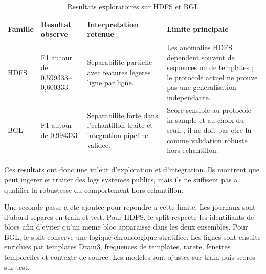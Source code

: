 \begin{table}[H]
\centering
\caption{Resultats exploratoires sur HDFS et BGL}
\label{tab:hdfs-bgl-exploratoires}
\scriptsize
\begin{tabularx}{\textwidth}{p{2.5cm}p{3.4cm}p{3.3cm}X}
\toprule
\textbf{Famille} & \textbf{Resultat observe} & \textbf{Interpretation retenue} & \textbf{Limite principale} \\
\midrule
HDFS & F1 autour de 0,599333--0,600333 & Separabilite partielle avec features legeres ligne par ligne. & Les anomalies HDFS dependent souvent de sequences ou de templates ; le protocole actuel ne prouve pas une generalisation independante. \\
BGL & F1 autour de 0,994333 & Separabilite forte dans l'echantillon traite et integration pipeline validee. & Score sensible au protocole in-sample et au choix du seuil ; il ne doit pas etre lu comme validation robuste hors echantillon. \\
\bottomrule
\end{tabularx}
\end{table}

Ces resultats ont donc une valeur d'exploration et d'integration. Ils montrent que \logminer{} peut ingerer et traiter des logs systemes publics, mais ils ne suffisent pas a qualifier la robustesse du comportement hors echantillon.

Une seconde passe a ete ajoutee pour repondre a cette limite. Les journaux sont d'abord separes en train et test. Pour HDFS, le split respecte les identifiants de blocs afin d'eviter qu'un meme bloc apparaisse dans les deux ensembles. Pour BGL, le split conserve une logique chronologique stratifiee. Les lignes sont ensuite enrichies par templates Drain3, frequences de templates, rarete, fenetres temporelles et contexte de source. Les modeles sont ajustes sur train puis scores sur test.

